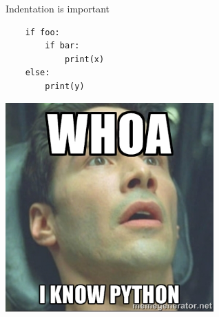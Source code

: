 \documentclass{beamer}
\begin{document}
\begin{frame}[fragile]{Indentation is important}
\begin{verbatim}
	if foo:
	    if bar:
	        print(x)
	else:
	    print(y)
\end{verbatim}
\end{frame}

\begin{frame}
	\begin{center}
		\includegraphics[width=0.6\textwidth]{./img/neo.jpg}
	\end{center}
\end{frame}
\end{document}
